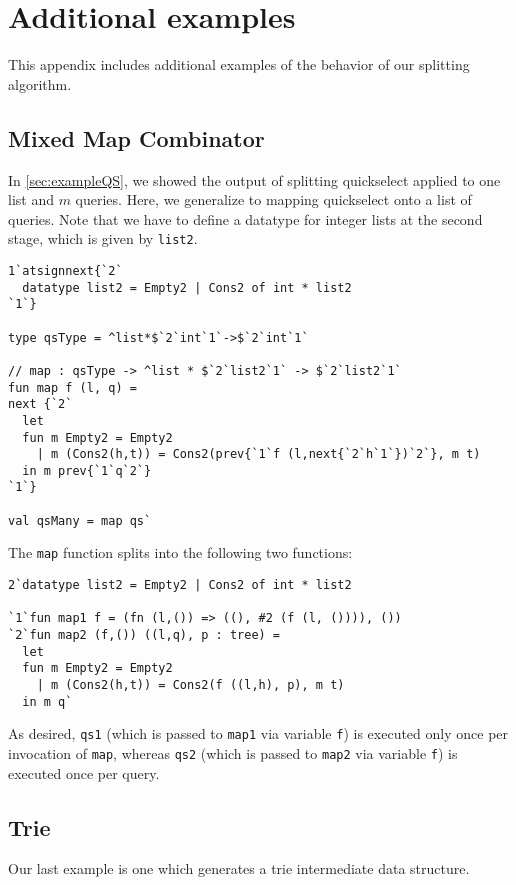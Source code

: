 
\section{Additional examples}

This appendix includes additional examples of the behavior of our
splitting algorithm.

\subsection {Mixed Map Combinator}

In \ref{sec:exampleQS}, we showed the output of splitting quickselect
applied to one list and $m$ queries.  Here, we generalize to mapping
quickselect onto a list of queries. Note that we have to define a
datatype for integer lists at the second stage, which is given by
\texttt{list2}.
\begin{lstlisting} 
1`atsignnext{`2`
  datatype list2 = Empty2 | Cons2 of int * list2
`1`}

type qsType = ^list*$`2`int`1`->$`2`int`1`

// map : qsType -> ^list * $`2`list2`1` -> $`2`list2`1`
fun map f (l, q) = 
next {`2`
  let 
  fun m Empty2 = Empty2
    | m (Cons2(h,t)) = Cons2(prev{`1`f (l,next{`2`h`1`})`2`}, m t)
  in m prev{`1`q`2`}
`1`}

val qsMany = map qs`
\end{lstlisting}
The \texttt{map} function splits into the following two functions:
\begin{lstlisting} 
2`datatype list2 = Empty2 | Cons2 of int * list2

`1`fun map1 f = (fn (l,()) => ((), #2 (f (l, ()))), ())
`2`fun map2 (f,()) ((l,q), p : tree) =
  let 
  fun m Empty2 = Empty2
    | m (Cons2(h,t)) = Cons2(f ((l,h), p), m t) 
  in m q`
\end{lstlisting}

As desired, \texttt{qs1} (which is passed to \texttt{map1} via variable \texttt{f}) is executed only once per invocation of \texttt{map},
whereas \texttt{qs2} (which is passed to \texttt{map2} via variable \texttt{f}) is executed once per query.

\subsection{Trie}

Our last example is one which generates a trie intermediate data structure.

